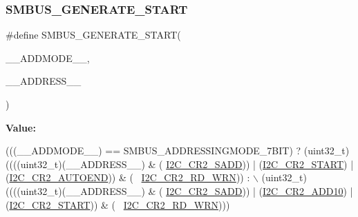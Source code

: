 \subsubsection{\texorpdfstring{S\+M\+B\+U\+S\+\_\+\+G\+E\+N\+E\+R\+A\+T\+E\+\_\+\+S\+T\+A\+RT}{SMBUS\_GENERATE\_START}}
{\footnotesize\ttfamily \#define S\+M\+B\+U\+S\+\_\+\+G\+E\+N\+E\+R\+A\+T\+E\+\_\+\+S\+T\+A\+RT(\begin{DoxyParamCaption}\item[{}]{\+\_\+\+\_\+\+A\+D\+D\+M\+O\+D\+E\+\_\+\+\_\+,  }\item[{}]{\+\_\+\+\_\+\+A\+D\+D\+R\+E\+S\+S\+\_\+\+\_\+ }\end{DoxyParamCaption})}

{\bfseries Value\+:}
\begin{DoxyCode}
(((\_\_ADDMODE\_\_) == SMBUS\_ADDRESSINGMODE\_7BIT) ? (uint32\_t)((((uint32\_t)(\_\_ADDRESS\_\_) & (
      \hyperlink{group___peripheral___registers___bits___definition_ga1a0478d3d85fc6aba608390ee2ea2d1c}{I2C\_CR2\_SADD})) | (\hyperlink{group___peripheral___registers___bits___definition_ga5ac78b87a12a9eaf564f5a3f99928478}{I2C\_CR2\_START}) | (\hyperlink{group___peripheral___registers___bits___definition_gabcf789c74e217ec8967bcabc156a6c54}{I2C\_CR2\_AUTOEND})) & (~
      \hyperlink{group___peripheral___registers___bits___definition_ga268ec714bbe4a75ea098c0e230a87697}{I2C\_CR2\_RD\_WRN})) : \(\backslash\)
                                                                  (uint32\_t)((((uint32\_t)(\_\_ADDRESS\_\_) & (
      \hyperlink{group___peripheral___registers___bits___definition_ga1a0478d3d85fc6aba608390ee2ea2d1c}{I2C\_CR2\_SADD})) | (\hyperlink{group___peripheral___registers___bits___definition_ga5454de5709c0e68a0068f9f5d39e5674}{I2C\_CR2\_ADD10}) | (\hyperlink{group___peripheral___registers___bits___definition_ga5ac78b87a12a9eaf564f5a3f99928478}{I2C\_CR2\_START})) & (~
      \hyperlink{group___peripheral___registers___bits___definition_ga268ec714bbe4a75ea098c0e230a87697}{I2C\_CR2\_RD\_WRN})))
\end{DoxyCode}

